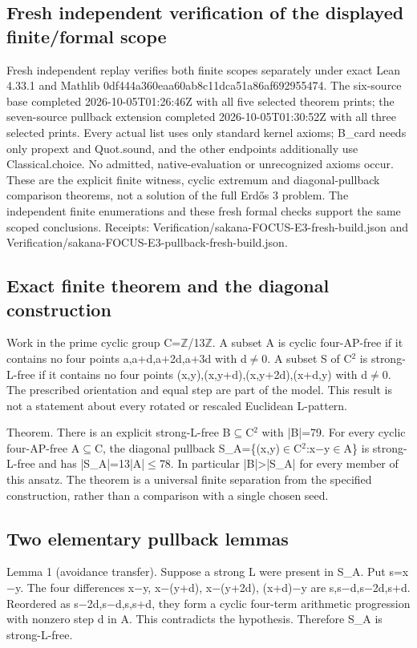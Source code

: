 \documentclass[11pt,a4paper]{article}
\begin{document}
\subsection{Fresh independent verification of the displayed finite/formal scope}
Fresh independent replay verifies both finite scopes separately under exact Lean 4.33.1 and Mathlib 0df444a360eaa60ab8c11dca51a86af692955474. The six-source base completed 2026-10-05T01:26:46Z with all five selected theorem prints; the seven-source pullback extension completed 2026-10-05T01:30:52Z with all three selected prints. Every actual list uses only standard kernel axioms; B\_card needs only propext and Quot.sound, and the other endpoints additionally use Classical.choice. No admitted, native-evaluation or unrecognized axioms occur. These are the explicit finite witness, cyclic extremum and diagonal-pullback comparison theorems, not a solution of the full Erdős 3 problem. The independent finite enumerations and these fresh formal checks support the same scoped conclusions. Receipts: Verification/sakana-FOCUS-E3-fresh-build.json and Verification/sakana-FOCUS-E3-pullback-fresh-build.json.

\subsection{Exact finite theorem and the diagonal construction}
Work in the prime cyclic group C=\ensuremath{\mathbb{Z}}/13\ensuremath{\mathbb{Z}}. A subset A is cyclic four-AP-free if it contains no four points a,a+d,a+2d,a+3d with d\ensuremath{\neq}0. A subset S of C\ensuremath{^2} is strong-L-free if it contains no four points (x,y),(x,y+d),(x,y+2d),(x+d,y) with d\ensuremath{\neq}0. The prescribed orientation and equal step are part of the model. This result is not a statement about every rotated or rescaled Euclidean L-pattern.

Theorem. There is an explicit strong-L-free B\ensuremath{\subseteq}C\ensuremath{^2} with |B|=79. For every cyclic four-AP-free A\ensuremath{\subseteq}C, the diagonal pullback S\_A=\{(x,y)\ensuremath{\in}C\ensuremath{^2}:x\ensuremath{-}y\ensuremath{\in}A\} is strong-L-free and has |S\_A|=13|A|\ensuremath{\leq}78. In particular |B|>|S\_A| for every member of this ansatz. The theorem is a universal finite separation from the specified construction, rather than a comparison with a single chosen seed.

\subsection{Two elementary pullback lemmas}
Lemma 1 (avoidance transfer). Suppose a strong L were present in S\_A. Put s=x\ensuremath{-}y. The four differences x\ensuremath{-}y, x\ensuremath{-}(y+d), x\ensuremath{-}(y+2d), (x+d)\ensuremath{-}y are s,s\ensuremath{-}d,s\ensuremath{-}2d,s+d. Reordered as s\ensuremath{-}2d,s\ensuremath{-}d,s,s+d, they form a cyclic four-term arithmetic progression with nonzero step d in A. This contradicts the hypothesis. Therefore S\_A is strong-L-free.
\end{document}

